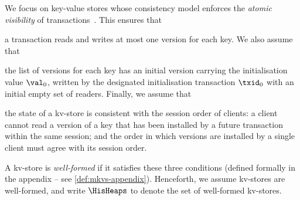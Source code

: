 We focus on key-value stores whose consistency model enforces the \emph{atomic visibility} of transactions~\cite{framework-concur}. 
This ensures that 
\begin{enumerate*}
	\item a transaction reads and writes at most one version for each key.
We also assume that 
	\item the list of versions for each key has an initial version 
carrying the initialisation value $\val_0$,  written by the designated initialisation transaction $\txid_0$ 
with an initial empty set of readers.
Finally, we assume that 
	\item the state of a kv-store is consistent with 
the session order of clients: a client cannot read a version of a key that has 
been installed by a future transaction within the same session;  and 
the order in which versions are installed by a single client must agree 
with its session order. 
\end{enumerate*}
A kv-store is \emph{well-formed} if it satisfies these three conditions (defined formally in the appendix -- see \cref{def:mkvs-appendix}). 
Henceforth, we assume kv-stores are well-formed, and write  $\HisHeaps$ to denote 
the set of well-formed kv-stores.


